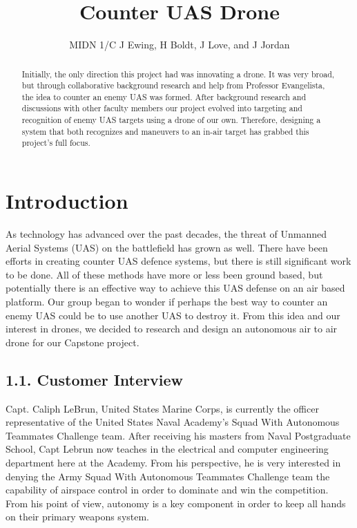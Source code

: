 \documentclass[10pt]{article}
\title{Counter UAS Drone}
\author{MIDN 1/C J Ewing, H Boldt, J Love, and J Jordan}
\date{\printdate{12/3/2020}}
\begin{document}
\maketitlepage
\cleardoublepage
\tableofcontents

\clearpage
\maketitle
\begin{abstract}
Initially, the only direction this project had was innovating a drone.  It was very broad, but through collaborative background research and help from Professor Evangelista, the idea to counter an enemy UAS was formed. After background research and discussions with other faculty members our project evolved into targeting and recognition of enemy UAS targets using a drone of our own. Therefore, designing a system that both recognizes and maneuvers to an in-air target has grabbed this project's full focus.  
\end{abstract}

\section{Introduction}
	As technology has advanced over the past decades, the threat of Unmanned Aerial Systems (UAS) on the battlefield has grown as well.  There have been efforts in creating counter UAS defence systems, but there is still significant work to be done.  All of these methods have more or less been ground based, but potentially there is an effective way to achieve this UAS defense on an air based platform.  Our group began to wonder if perhaps the best way to counter an enemy UAS could be to use another UAS to destroy it.  From this idea and our interest in drones, we decided to research and design an autonomous air to air drone for our Capstone project.  
        
\subsection{1.1. Customer Interview}
Capt. Caliph LeBrun, United States Marine Corps, is currently the officer representative of the United States Naval Academy’s Squad With Autonomous Teammates Challenge team. After receiving his masters from Naval Postgraduate School, Capt Lebrun now teaches in the electrical and computer engineering department here at the Academy. From his perspective, he is very interested in denying the Army Squad With Autonomous Teammates Challenge team the capability of airspace control in order to dominate and win the competition. From his point of view, autonomy is a key component in order to keep all hands on their primary weapons system.  
        
\end{document}
